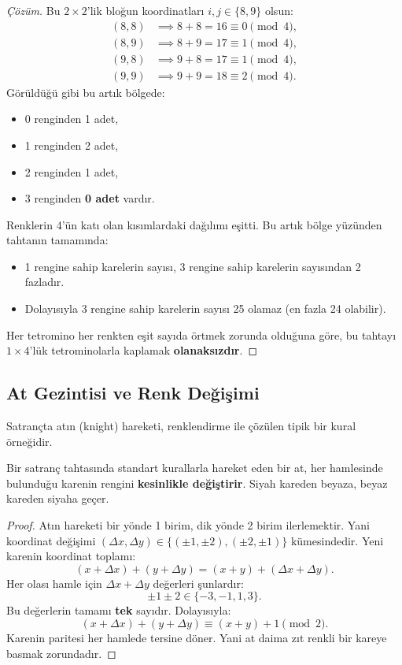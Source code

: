 \begin{proof}[Çözüm]
Bu $2 \times 2$'lik bloğun koordinatları $i, j \in \{8, 9\}$ olsun:
\begin{align*}
(8, 8) &\implies 8 + 8 = 16 \equiv 0 \pmod 4, \\
(8, 9) &\implies 8 + 9 = 17 \equiv 1 \pmod 4, \\
(9, 8) &\implies 9 + 8 = 17 \equiv 1 \pmod 4, \\
(9, 9) &\implies 9 + 9 = 18 \equiv 2 \pmod 4.
\end{align*}
Görüldüğü gibi bu artık bölgede:
\begin{itemize}
    \item 0 renginden 1 adet,
    \item 1 renginden 2 adet,
    \item 2 renginden 1 adet,
    \item 3 renginden \textbf{0 adet} vardır.
\end{itemize}

Renklerin 4'ün katı olan kısımlardaki dağılımı eşitti. Bu artık bölge yüzünden tahtanın tamamında:
\begin{itemize}
    \item 1 rengine sahip karelerin sayısı, 3 rengine sahip karelerin sayısından 2 fazladır.
    \item Dolayısıyla 3 rengine sahip karelerin sayısı 25 olamaz (en fazla 24 olabilir).
\end{itemize}

Her tetromino her renkten eşit sayıda örtmek zorunda olduğuna göre, bu tahtayı $1 \times 4$'lük tetrominolarla kaplamak \textbf{olanaksızdır}.
\end{proof}

\subsection{At Gezintisi ve Renk Değişimi}

Satrançta atın (knight) hareketi, renklendirme ile çözülen tipik bir kural örneğidir.

\begin{theorem}
Bir satranç tahtasında standart kurallarla hareket eden bir at, her hamlesinde bulunduğu karenin rengini \textbf{kesinlikle değiştirir}. Siyah kareden beyaza, beyaz kareden siyaha geçer.
\end{theorem}

\begin{proof}
Atın hareketi bir yönde 1 birim, dik yönde 2 birim ilerlemektir. Yani koordinat değişimi $(\Delta x, \Delta y) \in \{(\pm 1, \pm 2), (\pm 2, \pm 1)\}$ kümesindedir.
Yeni karenin koordinat toplamı:
\[
(x + \Delta x) + (y + \Delta y) = (x + y) + (\Delta x + \Delta y).
\]
Her olası hamle için $\Delta x + \Delta y$ değerleri şunlardır:
\[
\pm 1 \pm 2 \in \{-3, -1, 1, 3\}.
\]
Bu değerlerin tamamı \textbf{tek} sayıdır. Dolayısıyla:
\[
(x + \Delta x) + (y + \Delta y) \equiv (x + y) + 1 \pmod 2.
\]
Karenin paritesi her hamlede tersine döner. Yani at daima zıt renkli bir kareye basmak zorundadır.
\end{proof}

